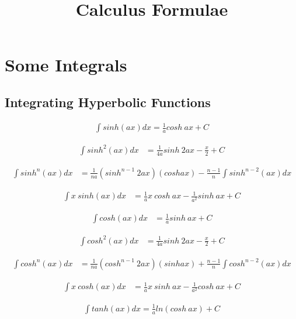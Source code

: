 \documentclass{article}
\title{Calculus Formulae}
\begin{document}
\maketitle

\section{Some Integrals}

\Large \subsection{Integrating Hyperbolic Functions}

\begin{align*}
    \int sinh(ax) dx = \frac{1}{a} cosh \ ax + C
\end{align*}

\begin{align*}
    \int sinh^2(ax) dx &= \frac{1}{4a} sinh \ 2ax - \frac{x}{2} + C
\end{align*}

\begin{align*}
    \int sinh^n(ax) dx &= \frac{1}{na} (sinh^{n-1} \ 2ax)(cosh ax) - \frac{n-1}{n} \int sinh^{n-2}(ax) dx
\end{align*}

\begin{align*}
    \int x \ sinh(ax) dx &= \frac{1}{a} x \ cosh \ ax - \frac{1}{a^2} sinh \ ax + C
\end{align*}

\begin{align*}
    \int cosh(ax) dx &= \frac{1}{a}sinh \ ax + C
\end{align*}

\begin{align*}
    \int cosh^2(ax) dx &= \frac{1}{4a} sinh \ 2ax - \frac{x}{2} + C
\end{align*}

\begin{align*}
    \int cosh^n(ax) dx &= \frac{1}{na} (cosh^{n-1} \ 2ax)(sinh ax) + \frac{n-1}{n} \int cosh^{n-2}(ax) dx
\end{align*}

\begin{align*}
    \int x \ cosh(ax) dx &= \frac{1}{a} x \ sinh \ ax - \frac{1}{a^2} cosh \ ax + C
\end{align*}

\begin{align*}
    \int tanh(ax) dx = \frac{1}{a} ln(cosh \ ax) + C
\end{align*}
\end{document}
